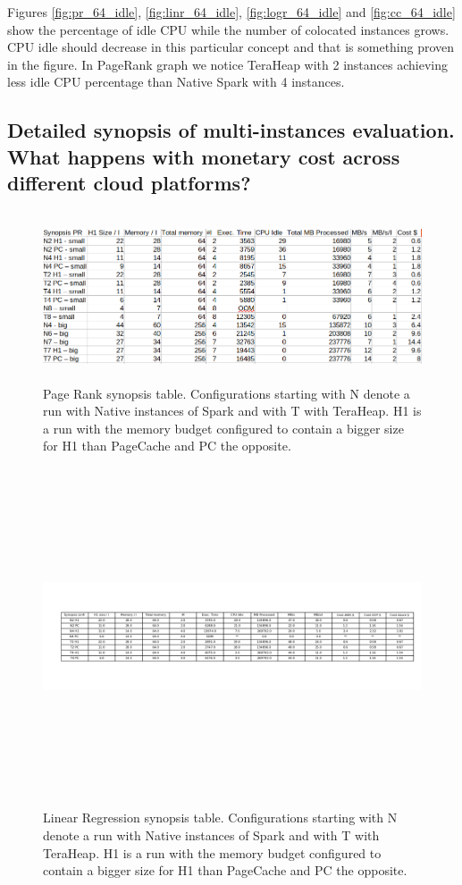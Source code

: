 Figures \ref{fig:pr_64_idle}, \ref{fig:linr_64_idle},
\ref{fig:logr_64_idle} and \ref{fig:cc_64_idle}  show the percentage
of idle CPU while the number of colocated instances grows. CPU idle
should decrease in this particular concept and that is something
proven in the figure. In PageRank graph we notice TeraHeap with 2
instances achieving less idle CPU percentage than Native Spark with 4
instances.

\subsection{Detailed synopsis of multi-instances evaluation. What
happens with monetary cost across different cloud platforms?}

\begin{figure}[ht]
        \includegraphics[width=18cm,height=5cm]{./fig/pr_table.png}
    \caption{Page Rank synopsis table. Configurations starting with N
    denote a run with Native instances of Spark and with T with
    TeraHeap. H1 is a run with the memory budget configured to contain
    a bigger size for H1 than PageCache and PC the opposite.}
	\label{fig:pr_table}
\end{figure}

\begin{figure}[ht]
        \includegraphics[width=20cm,height=10cm]{./fig/linr_table.png}
    \caption{Linear Regression synopsis table. Configurations starting
    with N denote a run with Native instances of Spark and with T with
    TeraHeap. H1 is a run with the memory budget configured to contain
    a bigger size for H1 than PageCache and PC the opposite.}
	\label{fig:linr_table}
\end{figure}

